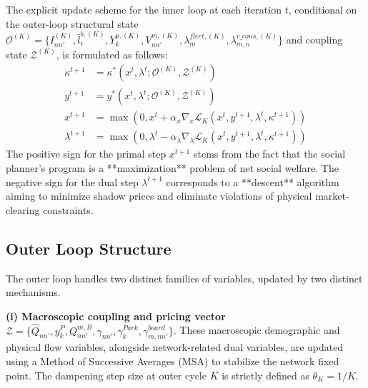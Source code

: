\documentclass[11pt,a4paper]{article}
\newcommand{\Proj}[1]{\max\left(0, #1\right)}
\begin{document}
The explicit update scheme for the inner loop at each iteration $t$, conditional on the outer-loop structural state $\mathcal{O}^{(K)} = \{I_{nn'}^{(K)}, \bar l_i^{b,(K)}, Y_k^{p,(K)}, V_{nn'}^{m,(K)}, \lambda^{fleet,(K)}_m, \lambda^{v\_cons,(K)}_{m,n}\}$ and coupling state $\mathcal{Z}^{(K)}$, is formulated as follows:
\begin{align}
    \kappa^{t+1} &= \kappa^*(x^t, \lambda^t; \mathcal{O}^{(K)}, \mathcal{Z}^{(K)}) \\
    y^{t+1} &= y^*(x^t, \lambda^t; \mathcal{O}^{(K)}, \mathcal{Z}^{(K)}) \\
    x^{t+1} &= \Proj{x^t + \alpha_x \nabla_x \mathcal{L}_K(x^t, y^{t+1}, \lambda^t, \kappa^{t+1})} \\
    \lambda^{t+1} &= \Proj{\lambda^t - \alpha_{\lambda} \nabla_{\lambda} \mathcal{L}_K(x^t, y^{t+1}, \lambda^t, \kappa^{t+1})}
\end{align}
The positive sign for the primal step $x^{t+1}$ stems from the fact that the social planner's program is a **maximization** problem of net social welfare. The negative sign for the dual step $\lambda^{t+1}$ corresponds to a **descent** algorithm aiming to minimize shadow prices and eliminate violations of physical market-clearing constraints.

\subsection{Outer Loop Structure}

The outer loop handles two distinct families of variables, updated by two distinct mechanisms.

\textbf{(i) Macroscopic coupling and pricing vector} $\mathcal{Z} = \{\hat Q_{nn'}, y_k^P, Q_{nn'}^{m, B}, \gamma_{nn'}, \gamma_k^{Park}, \gamma^{board}_{m, nn'}\}$. These macroscopic demographic and physical flow variables, alongside network-related dual variables, are updated using a Method of Successive Averages (MSA) to stabilize the network fixed point. The dampening step size at outer cycle $K$ is strictly defined as $\theta_K = 1/K$.
\end{document}
